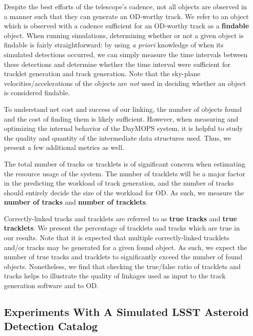 Despite the best efforts of the telescope's cadence, not all objects
are observed in a manner such that they can generate an OD-worthy
track.  We refer to an object which is observed with a cadence
sufficient for an OD-worthy track as a \textbf{findable} object.  When
running simulations, determining whether or not a given object is
findable is fairly straightforward: by using \textit{a priori}
knowledge of when its simulated detections occurred, we can simply
measure the time intervals between these detections and determine
whether the time interval were sufficient for tracklet generation and
track generation.  Note that the sky-plane velocities/accelerations of
the objects are \textit{not} used in deciding whether an object is
considered findable.


To understand net cost and success of our linking, the number of
objects found and the cost of finding them is likely sufficient.
However, when measuring and optimizing the internal behavior of the
DayMOPS system, it is helpful to study the quality and quantity of the
intermediate data structures used. Thus, we present a few additional
metrics as well.

The total number of tracks or tracklets is of significant concern when
estimating the resource usage of the system.  The number of tracklets
will be a major factor in the predicting the workload of track
generation, and the number of tracks should entirely decide the size
of the workload for OD.  As such, we measure the \textbf{number of
  tracks} and \textbf{number of tracklets}.  

Correctly-linked tracks and tracklets are referred to as \textbf{true
  tracks} and \textbf{true tracklets}. We present the percentage of
tracklets and tracks which are true in our results. Note that it is
expected that multiple correctly-linked tracklets and/or tracks may be
generated for a given found object. As such, we expect the number of
true tracks and tracklets to significantly exceed the number of found
objects.  Nonetheless, we find that checking the true/false ratio of
tracklets and tracks helps to illustrate the quality of linkages used
as input to the track generation software and to OD.





\subsection{Experiments With A Simulated LSST Asteroid Detection Catalog}

